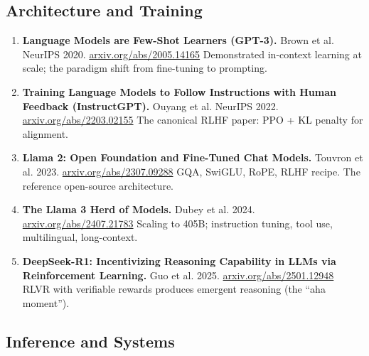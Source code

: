 \documentclass[11pt,a4paper]{article}
\begin{document}
\subsection*{Architecture and Training}

\begin{enumerate}[leftmargin=2em,label=(\arabic*),start=6]
	\item \textbf{Language Models are Few-Shot Learners (GPT-3).} Brown et al. NeurIPS 2020.
	      \href{https://arxiv.org/abs/2005.14165}{arxiv.org/abs/2005.14165}
	      \newline Demonstrated in-context learning at scale; the paradigm shift from fine-tuning to prompting.

	\item \textbf{Training Language Models to Follow Instructions with Human Feedback (InstructGPT).}
	      Ouyang et al. NeurIPS 2022. \href{https://arxiv.org/abs/2203.02155}{arxiv.org/abs/2203.02155}
	      \newline The canonical RLHF paper: PPO + KL penalty for alignment.

	\item \textbf{Llama 2: Open Foundation and Fine-Tuned Chat Models.} Touvron et al. 2023.
	      \href{https://arxiv.org/abs/2307.09288}{arxiv.org/abs/2307.09288}
	      \newline GQA, SwiGLU, RoPE, RLHF recipe. The reference open-source architecture.

	\item \textbf{The Llama 3 Herd of Models.} Dubey et al. 2024.
	      \href{https://arxiv.org/abs/2407.21783}{arxiv.org/abs/2407.21783}
	      \newline Scaling to 405B; instruction tuning, tool use, multilingual, long-context.

	\item \textbf{DeepSeek-R1: Incentivizing Reasoning Capability in LLMs via Reinforcement Learning.}
	      Guo et al. 2025. \href{https://arxiv.org/abs/2501.12948}{arxiv.org/abs/2501.12948}
	      \newline RLVR with verifiable rewards produces emergent reasoning (the ``aha moment'').
\end{enumerate}

\subsection*{Inference and Systems}
\end{document}
